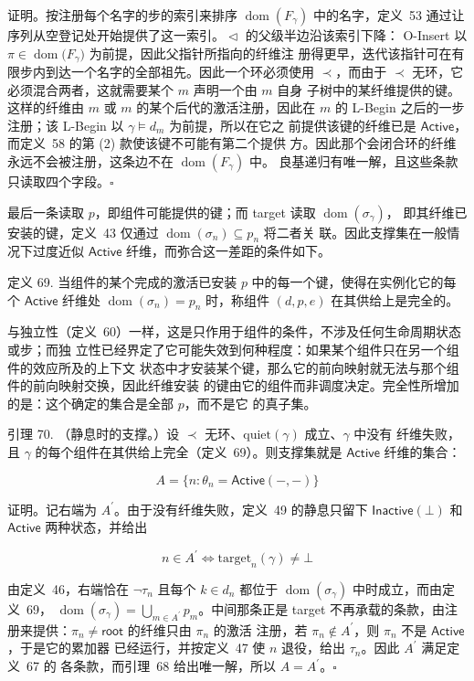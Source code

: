 证明。按注册每个名字的步的索引来排序 \(\operatorname{dom}(F_{\gamma})\) 中的名字，定义~53
通过让序列从空登记处开始提供了这一索引。\(\vartriangleleft\) 的父级半边沿该索引下降：
O-Insert 以 \(\pi \in \operatorname{dom}\big(F_{\gamma}\big)\) 为前提，因此父指针所指向的纤维注
册得更早，迭代该指针可在有限步内到达一个名字的全部祖先。因此一个环必须使用
\(\prec\)，而由于 \(\prec\) 无环，它必须混合两者，这就需要某个 \(m\) 声明一个由 \(m\) 自身
子树中的某纤维提供的键。这样的纤维由 \(m\) 或 \(m\) 的某个后代的激活注册，因此在
\(m\) 的 L-Begin 之后的一步注册；该 L-Begin 以 \(\gamma \models d_{m}\) 为前提，所以在它之
前提供该键的纤维已是 \(\mathsf{Active}\)，而定义~58 的第 (2) 款使该键不可能有第二个提供
方。因此那个会闭合环的纤维永远不会被注册，这条边不在 \(\operatorname{dom}(F_{\gamma})\) 中。
良基递归有唯一解，且这些条款只读取四个字段。\(\square\)

最后一条读取 \(p\)，即组件可能提供的键；而 target 读取 \(\operatorname{dom}(\sigma_{\gamma})\)，
即其纤维已安装的键，定义~43 仅通过 \(\operatorname{dom}(\sigma_{n}) \subseteq p_{n}\) 将二者关
联。因此支撑集在一般情况下过度近似 \(\mathsf{Active}\) 纤维，而弥合这一差距的条件如下。

定义 69. 当组件的某个完成的激活已安装 \(p\) 中的每一个键，使得在实例化它的每个
\(\mathsf{Active}\) 纤维处 \(\operatorname{dom}(\sigma_{n}) = p_{n}\) 时，称组件 \((d, p, e)\)
在其供给上是完全的。

与独立性（定义~60）一样，这是只作用于组件的条件，不涉及任何生命周期状态或步；而独
立性已经界定了它可能失效到何种程度：如果某个组件只在另一个组件的效应所及的上下文
状态中才安装某个键，那么它的前向映射就无法与那个组件的前向映射交换，因此纤维安装
的键由它的组件而非调度决定。完全性所增加的是：这个确定的集合是全部 \(p\)，而不是它
的真子集。

引理 70. （静息时的支撑。）设 \(\prec\) 无环、\(\mathrm{quiet}(\gamma)\) 成立、\(\gamma\) 中没有
纤维失败，且 \(\gamma\) 的每个组件在其供给上完全（定义~69）。则支撑集就是
\(\mathsf{Active}\) 纤维的集合：

\[
A = \{ n : \theta_{n} = \mathsf{Active}(-,-) \} \tag{64}
\]

证明。记右端为 \(A^{\prime}\)。由于没有纤维失败，定义~49 的静息只留下
\(\mathsf{Inactive}(\bot)\) 和 \(\mathsf{Active}\) 两种状态，并给出

\[
n \in A^{\prime} \Longleftrightarrow \mathrm{target}_{n}(\gamma) \neq \bot
\]

由定义~46，右端恰在 \(\neg \tau_{n}\) 且每个 \(k \in d_{n}\) 都位于
\(\operatorname{dom}(\sigma_{\gamma})\) 中时成立，而由定义~69，
\(\operatorname{dom}(\sigma_{\gamma}) = \bigcup_{m \in A^{\prime}} p_{m}\)。中间那条正是 target
不再承载的条款，由注册来提供：\(\pi_{n} \neq \mathsf{root}\) 的纤维只由 \(\pi_{n}\) 的激活
注册，若 \(\pi_{n} \notin A^{\prime}\)，则 \(\pi_{n}\) 不是 \(\mathsf{Active}\)，于是它的累加器
已经运行，并按定义~47 使 \(n\) 退役，给出 \(\tau_{n}\)。因此 \(A^{\prime}\) 满足定义~67 的
各条款，而引理~68 给出唯一解，所以 \(A = A^{\prime}\)。\(\square\)


